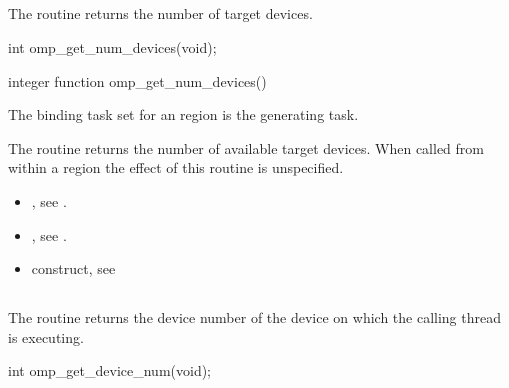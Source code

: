 \subsection{}
\label{subsec:omp_get_num_devices}
\summary
The  routine returns the number of target devices.

\format
\begin{ccppspecific}
\begin{ompcFunction}
int omp_get_num_devices(void);
\end{ompcFunction}
\end{ccppspecific}

\begin{fortranspecific}
\begin{ompfFunction}
integer function omp_get_num_devices()
\end{ompfFunction}
\end{fortranspecific}

\binding
The binding task set for an  region is the generating task.

\effect
The  routine returns the number of 
available target devices. When called from within a  
region the effect of this routine is unspecified.

\crossreferences
\begin{itemize}
\item {}, see
.

\item {}, see
.

\item {} construct, see
\end{itemize}



\subsection{}
\label{subsec:omp_get_device_num}
\summary
The  routine returns the device number 
of the device on which the calling thread is executing.

\format
\begin{ccppspecific}
\begin{ompcFunction}
int omp_get_device_num(void);
\end{ompcFunction}
\end{ccppspecific}


